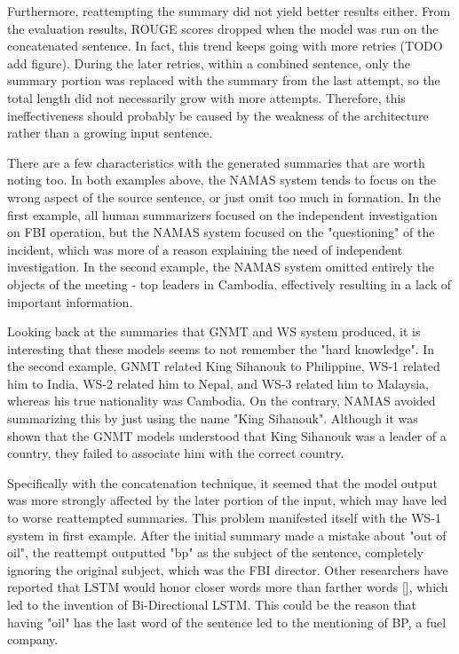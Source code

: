 \documentclass[letterpaper]{article} %
\begin{document}
Furthermore, reattempting the summary did not yield better results either. From the evaluation results, ROUGE scores dropped when the model was run on the concatenated sentence. In fact, this trend keeps going with more retries (TODO add figure). During the later retries, within a combined sentence, only the summary portion was replaced with the summary from the last attempt, so the total length did not necessarily grow with more attempts. Therefore, this ineffectiveness should probably be caused by the weakness of the architecture rather than a growing input sentence.

There are a few characteristics with the generated summaries that are worth noting too. In both examples above, the NAMAS system tends to focus on the wrong aspect of the source sentence, or just omit too much in formation. In the first example, all human summarizers focused on the independent investigation on FBI operation, but the NAMAS system focused on the "questioning" of the incident, which was more of a reason explaining the need of independent investigation. In the second example, the NAMAS system omitted entirely the objects of the meeting - top leaders in Cambodia, effectively resulting in a lack of important information.

Looking back at the summaries that GNMT and WS system produced, it is interesting that these models seems to not remember the "hard knowledge". In the second example, GNMT related King Sihanouk to Philippine, WS-1 related him to India, WS-2 related him to Nepal, and WS-3 related him to Malaysia, whereas his true nationality was Cambodia. On the contrary, NAMAS avoided summarizing this by just using the name "King Sihanouk". Although it was shown that the GNMT models understood that King Sihanouk was a leader of a country, they failed to associate him with the correct country.

Specifically with the concatenation technique, it seemed that the model output was more strongly affected by the later portion of the input, which may have led to worse reattempted summaries. This problem manifested itself with the WS-1 system in first example. After the initial summary made a mistake about "out of oil", the reattempt outputted "bp" as the subject of the sentence, completely ignoring the original subject, which was the FBI director. Other researchers have reported that LSTM would honor closer words more than farther words [], which led to the invention of Bi-Directional LSTM. This could be the reason that having "oil" has the last word of the sentence led to the mentioning of BP, a fuel company.
\end{document}
